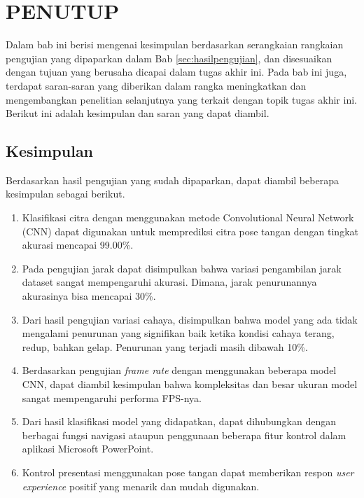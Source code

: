 \chapter{PENUTUP}
\label{chap:penutup}

Dalam bab ini berisi mengenai kesimpulan berdasarkan serangkaian rangkaian pengujian yang dipaparkan dalam Bab \ref{sec:hasilpengujian}, dan disesuaikan dengan tujuan yang berusaha dicapai dalam tugas akhir ini. Pada bab ini juga, terdapat saran-saran yang diberikan dalam rangka meningkatkan dan mengembangkan penelitian selanjutnya yang terkait dengan topik tugas akhir ini. Berikut ini adalah kesimpulan dan saran yang dapat diambil. 

\section{Kesimpulan}
\label{sec:kesimpulan}

Berdasarkan hasil pengujian yang sudah dipaparkan, dapat diambil beberapa kesimpulan sebagai berikut.

\begin{enumerate}[nolistsep]
  \item Klasifikasi citra dengan menggunakan metode Convolutional Neural Network (CNN) dapat digunakan untuk memprediksi citra pose tangan dengan tingkat akurasi mencapai 99.00\%. 
  \item Pada pengujian jarak dapat disimpulkan bahwa variasi pengambilan jarak dataset sangat mempengaruhi akurasi. Dimana, jarak penurunannya akurasinya bisa mencapai 30\%.
  \item Dari hasil pengujian variasi cahaya, disimpulkan bahwa model yang ada tidak mengalami penurunan yang signifikan baik ketika kondisi cahaya terang, redup, bahkan gelap. Penurunan yang terjadi masih dibawah 10\%.
  \item Berdasarkan pengujian \emph{frame rate} dengan menggunakan beberapa model CNN, dapat diambil kesimpulan bahwa kompleksitas dan besar ukuran model sangat mempengaruhi performa FPS-nya. 
  \item Dari hasil klasifikasi model yang didapatkan, dapat dihubungkan dengan berbagai fungsi navigasi ataupun penggunaan beberapa fitur kontrol dalam aplikasi Microsoft PowerPoint. 
  \item Kontrol presentasi menggunakan pose tangan dapat memberikan respon \emph{user experience} positif yang menarik dan mudah digunakan. 
\end{enumerate}   

